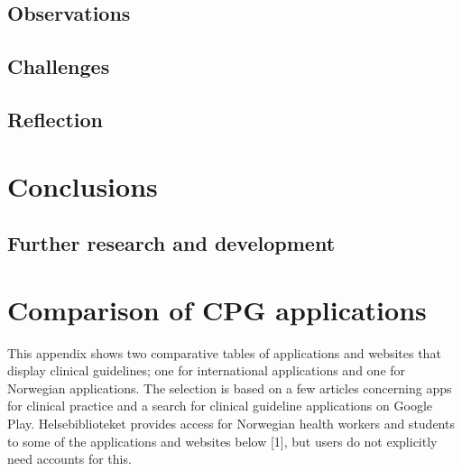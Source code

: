 \documentclass[a4paper,12pt,oneside]{book}
\begin{document}
\section{Observations}
\section{Challenges}
\section{Reflection}



\chapter{Conclusions}
\section{Further research and development}


\backmatter
\printbibliography


\appendix
\chapter{Comparison of CPG applications}\label{appendix:ComparisonApps}
This appendix shows two comparative tables of applications and websites that display clinical guidelines; one for international applications and one for Norwegian applications. The selection is based on a few articles concerning apps for clinical practice and a search for clinical guideline applications on Google Play.
Helsebiblioteket provides access for Norwegian health workers and students to some of the applications and websites below [1], but users do not explicitly need accounts for this.

\end{document}
